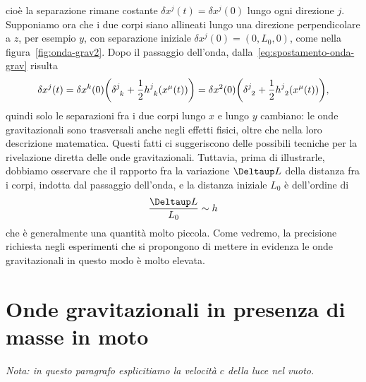 cioè la separazione rimane costante $\delta x^{j}(t) = \delta x^{j}(0)$ lungo
ogni direzione $j$.  Supponiamo ora che i due corpi siano allineati lungo una
direzione perpendicolare a $z$, per esempio $y$, con separazione iniziale
$\delta x^{j}(0) = (0,L_{0},0)$, come nella figura~\ref{fig:onda-grav2}.  Dopo
il passaggio dell'onda, dalla~\eqref{eq:spostamento-onda-grav} risulta
\begin{equation}
  \delta x^{j}(t) = \delta x^{k}(0) \bigg(\tensor{\delta}{^{j}_{k}} +
  \frac{1}{2}\tensor{h}{^{j}_{k}}(x^{\mu}(t))\bigg) = \delta
  x^{2}(0)\bigg(\tensor{\delta}{^{j}_{2}} +
  \frac{1}{2}\tensor{h}{^{j}_{2}}(x^{\mu}(t))\bigg),
\end{equation}
quindi solo le separazioni fra i due corpi lungo $x$ e lungo $y$ cambiano: le
onde gravitazionali sono trasversali anche negli effetti fisici, oltre che nella
loro descrizione matematica.  Questi fatti ci suggeriscono delle possibili
tecniche per la rivelazione diretta delle onde gravitazionali.  Tuttavia, prima
di illustrarle, dobbiamo osservare che il rapporto fra la variazione $\var L$
della distanza fra i corpi, indotta dal passaggio dell'onda, e la distanza
iniziale $L_{0}$ è dell'ordine di
\begin{equation}
  \frac{\var L}{L_{0}} \sim h
\end{equation}
che è generalmente una quantità molto piccola.  Come vedremo, la precisione
richiesta negli esperimenti che si propongono di mettere in evidenza le onde
gravitazionali in questo modo è molto elevata.

\section{Onde gravitazionali in presenza di masse in moto}
\label{sec:onde-grav-masse}

\emph{Nota: in questo paragrafo esplicitiamo la velocità $c$ della luce nel
  vuoto.}

